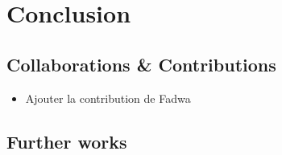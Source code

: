 
\chapter{Conclusion} %
\label{cha:conclusion}

\section{Collaborations \& Contributions} %
\label{sec:collaborations_&_contributions}

\begin{itemize}
	\item Ajouter la contribution de Fadwa
\end{itemize}


\section{Further works} %
\label{sec:further_works}

\lipsum


